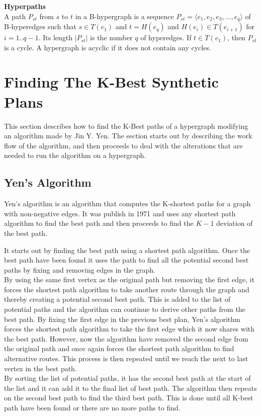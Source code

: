 \documentclass[a4paper,10pt,titlepage]{paper}
\begin{document}
\textbf{Hyperpaths}\\
A path $P_{st}$ from $s$ to $t$ in a B-hypergraph is a sequence $P_{st}=\langle e_1, e_2, e_3, ... , e_q \rangle$ of B-hyperedges such that $s\in T(e_1)$ and $t=H(e_q)$ and $H(e_i) \in T(e_{i+1})$ for $i=1..q-1$. Its length $|P_{st}|$ is the number $q$ of hyperedges. If $t \in T(e_1)$, then $P_{st}$ is a cycle. A hypergraph is acyclic if it does not contain any cycles. \cite{Fagerberg}

\section{Finding The K-Best Synthetic Plans}
This section describes how to find the K-Best paths of a hypergraph modifying an algorithm made by Jin Y. Yen. The section starts out by describing the work flow of the algorithm, and then proceeds to deal with the alterations that are needed to run the algorithm on a hypergraph.
\subsection{Yen's Algorithm}
Yen's algorithm is an algorithm that computes the K-shortest paths for a graph with non-negative edges. It was publish in 1971 and uses any shortest path algorithm to find the best path and then proceeds to find the $K-1$ deviation of the best path. \cite{Yen}

It starts out by finding the best path using a shortest path algorithm. Once the best path have been found it uses the path to find all the potential second best paths by fixing and removing edges in the graph. \\
By using the same first vertex as the original path but removing the first edge, it forces the shortest path algorithm to take another route through the graph and thereby creating a potential second best path. This is added to the list of potential paths and the algorithm can continue to derive other paths from the best path. By fixing the first edge in the previous best plan, Yen's algorithm forces the shortest path algorithm to take the first edge which it now shares with the best path. However, now the algorithm have removed the second edge from the original path and once again forces the shortest path algorithm to find alternative routes. This process is then repeated until we reach the next to last vertex in the best path.\\
By sorting the list of potential paths, it has the second best path at the start of the list and it can add it to the final list of best path. The algorithm then repeats on the second best path to find the third best path. This is done until all K-best path have been found or there are no more paths to find.
\end{document}
